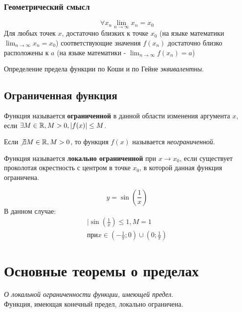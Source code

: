 \subsubsection*{Геометрический смысл}

\[
\forall x_{n} \lim_{n \to \infty} x_{n} = x_0
\] 
Для любых точек $x$, достаточно близких к точке $x_0$ (на языке математики $\lim_{n \to \infty} x_{n} = x_0$) соответствующие значения $f(x_{n})$ достаточно близко расположены к $a$ (на языке математики - $\lim_{n \to \infty} f(x_{n}) = a$)

\begin{theorem}
  Определение предела функции по Коши и по Гейне \textit{эквивалентны}. 
\end{theorem}

\subsection{Ограниченная функция}

\begin{definition}
  Функция называется \textbf{ограниченной} в данной области изменения аргумента $x$, если $\exists M\in \mathbb{R}, M > 0, |f(x)| \le M$.
\end{definition}

Если $\not \exists M \in \mathbb{R}, M > 0$, то функция $f(x)$ называется \textit{неограниченной}.

\begin{definition}
  Функция называется \textbf{локально ограниченной} при $x \to x_0$, если существует проколотая окрестность с центром в точке $x_0$, в которой данная функция ограничена.
\end{definition}
\begin{eg}
  \[
  y = \sin(\frac{1}{x})
  \] 
  В данном случае:
  \begin{gather*}
    |\sin(\frac{1}{x}) \le 1, M = 1 \\
    при x \in (-\frac{1}{\pi}; 0) \cup (0; \frac{1}{\pi})
  \end{gather*}
\end{eg}

\section{Основные теоремы о пределах}

\begin{theorem}
  \textit{О локальной ограниченности функции, имеющей предел}. \\
  Функция, имеющая конечный предел, локально ограничена.
\end{theorem}

